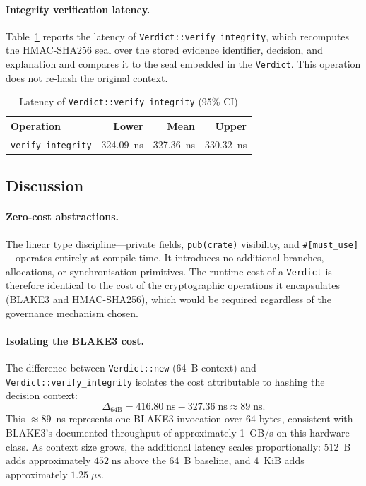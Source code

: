 \paragraph{Integrity verification latency.}
Table~\ref{tab:verify} reports the latency of
\texttt{Verdict::verify\_integrity}, which recomputes the
HMAC-SHA256 seal over the stored evidence identifier, decision, and
explanation and compares it to the seal embedded in the
\texttt{Verdict}.  This operation does not re-hash the original
context.

\begin{table}[t]
\caption{Latency of \texttt{Verdict::verify\_integrity} (95\% CI)}
\label{tab:verify}
\begin{tabular}{lrrr}
\hline
\textbf{Operation} & \textbf{Lower} & \textbf{Mean} & \textbf{Upper} \\
\hline
\texttt{verify\_integrity} & 324.09~ns & 327.36~ns & 330.32~ns \\
\hline
\end{tabular}
\end{table}

\subsection{Discussion}
\label{sec:discussion}

\paragraph{Zero-cost abstractions.}
The linear type discipline---private fields, \texttt{pub(crate)}
visibility, and \texttt{\#[must\_use]}---operates entirely at compile
time.  It introduces no additional branches, allocations, or
synchronisation primitives.  The runtime cost of a
\texttt{Verdict} is therefore identical to the cost of the
cryptographic operations it encapsulates (BLAKE3 and HMAC-SHA256),
which would be required regardless of the governance mechanism chosen.

\paragraph{Isolating the BLAKE3 cost.}
The difference between \texttt{Verdict::new} (64~B context) and
\texttt{Verdict::verify\_integrity} isolates the cost attributable
to hashing the decision context:
\[
  \Delta_{64\mathrm{B}} = 416.80\;\text{ns} - 327.36\;\text{ns}
                        \approx 89\;\text{ns}.
\]
This $\approx 89$~ns represents one BLAKE3 invocation over 64 bytes,
consistent with BLAKE3's documented throughput of approximately
1~GB/s on this hardware class.  As context size grows, the
additional latency scales proportionally: 512~B adds approximately
$452\;\text{ns}$ above the 64~B baseline, and 4~KiB adds
approximately $1.25\;\mu\text{s}$.

